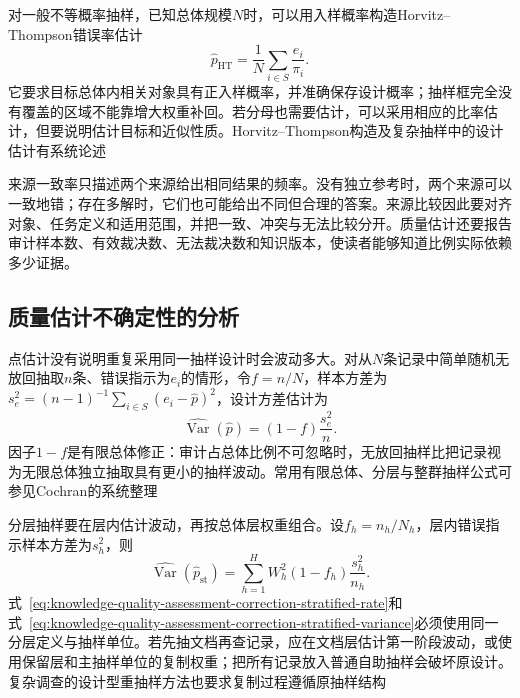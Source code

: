 对一般不等概率抽样，已知总体规模$N$时，可以用入样概率构造Horvitz--Thompson错误率估计
\begin{equation}
  \widehat p_{\mathrm{HT}}
  =
  \frac{1}{N}
  \sum_{i\in S}\frac{e_i}{\pi_i}.
  \label{eq:knowledge-quality-assessment-correction-ht-rate}
\end{equation}
它要求目标总体内相关对象具有正入样概率，并准确保存设计概率；抽样框完全没有覆盖的区域不能靠增大权重补回。若分母也需要估计，可以采用相应的比率估计，但要说明估计目标和近似性质。Horvitz--Thompson构造及复杂抽样中的设计估计有系统论述

来源一致率只描述两个来源给出相同结果的频率。没有独立参考时，两个来源可以一致地错；存在多解时，它们也可能给出不同但合理的答案。来源比较因此要对齐对象、任务定义和适用范围，并把一致、冲突与无法比较分开。质量估计还要报告审计样本数、有效裁决数、无法裁决数和知识版本，使读者能够知道比例实际依赖多少证据。

\subsection{质量估计不确定性的分析}
\label{sec:knowledge-quality-assessment-correction-uncertainty}

点估计没有说明重复采用同一抽样设计时会波动多大。对从$N$条记录中简单随机无放回抽取$n$条、错误指示为$e_i$的情形，令$f=n/N$，样本方差为$s_e^2=(n-1)^{-1}\sum_{i\in S}(e_i-\widehat p)^2$，设计方差估计为
\begin{equation}
  \widehat{\operatorname{Var}}(\widehat p)
  =
  (1-f)\frac{s_e^2}{n}.
  \label{eq:knowledge-quality-assessment-correction-srs-variance}
\end{equation}
因子$1-f$是有限总体修正：审计占总体比例不可忽略时，无放回抽样比把记录视为无限总体独立抽取具有更小的抽样波动。常用有限总体、分层与整群抽样公式可参见Cochran的系统整理

分层抽样要在层内估计波动，再按总体层权重组合。设$f_h=n_h/N_h$，层内错误指示样本方差为$s_h^2$，则
\begin{equation}
  \widehat{\operatorname{Var}}(\widehat p_{\mathrm{st}})
  =
  \sum_{h=1}^{H}
  W_h^2(1-f_h)\frac{s_h^2}{n_h}.
  \label{eq:knowledge-quality-assessment-correction-stratified-variance}
\end{equation}
式~\eqref{eq:knowledge-quality-assessment-correction-stratified-rate}和式~\eqref{eq:knowledge-quality-assessment-correction-stratified-variance}必须使用同一分层定义与抽样单位。若先抽文档再查记录，应在文档层估计第一阶段波动，或使用保留层和主抽样单位的复制权重；把所有记录放入普通自助抽样会破坏原设计。复杂调查的设计型重抽样方法也要求复制过程遵循原抽样结构

